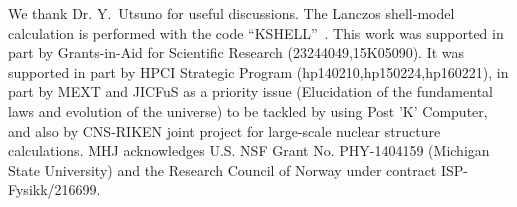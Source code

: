 \documentclass[aps,prl,twocolumn,groupedaddress,showkeys,showpacs,floatfix,superscriptaddress]{revtex4-1}
\newcommand\+{^\dagger}
\begin{document}
\begin{acknowledgments}
We thank Dr. Y.~Utsuno for useful discussions.
The Lanczos shell-model calculation is performed with the code
``KSHELL''~\cite{Shimizu:1613378}.
This work was supported in part by Grants-in-Aid for Scientific Research (23244049,15K05090). 
It was supported in part by HPCI Strategic Program (hp140210,hp150224,hp160221), in part by MEXT and JICFuS 
as a priority issue (Elucidation of the fundamental laws and evolution of the universe) 
to be tackled by using Post 'K' Computer, 
and also by CNS-RIKEN joint project for large-scale nuclear structure calculations.
MHJ acknowledges U.S. NSF Grant No. PHY-1404159 (Michigan State University) and the Research Council of Norway
under contract ISP-Fysikk/216699. 

\end{acknowledgments}


%
\end{document}
